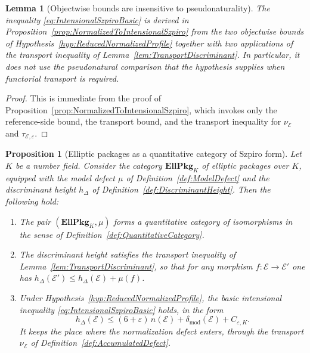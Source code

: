 \documentclass[10pt, reqno]{amsart}
\theoremstyle{plain}
\newtheorem{proposition}[theorem]{Proposition}
\newtheorem{lemma}[theorem]{Lemma}
\theoremstyle{definition}
\theoremstyle{plain}
\newcommand{\defect}{\delta_{\mathrm{mod}}}
\begin{document}
\begin{lemma}[Objectwise bounds are insensitive to pseudonaturality]\label{lem:ObjectwiseInsensitive}
The inequality \eqref{eq:IntensionalSzpiroBasic} is derived in Proposition~\ref{prop:NormalizedToIntensionalSzpiro} from the two objectwise bounds of Hypothesis~\ref{hyp:ReducedNormalizedProfile} together with two applications of the transport inequality of Lemma~\ref{lem:TransportDiscriminant}. In particular, it does not use the pseudonatural comparison that the hypothesis supplies when functorial transport is required.
\end{lemma}

\begin{proof}
This is immediate from the proof of Proposition~\ref{prop:NormalizedToIntensionalSzpiro}, which invokes only the reference-side bound, the transport bound, and the transport inequality for $\nu_{\mathcal{E}}$ and $\tau_{\mathcal{E},\varepsilon}$.
\end{proof}

\begin{proposition}[Elliptic packages as a quantitative category of Szpiro form]\label{prop:EllPkgQuantitativeSzpiro}
Let $K$ be a number field. Consider the category $\mathbf{EllPkg}_K$ of elliptic packages over $K$, equipped with the model defect $\mu$ of Definition~\ref{def:ModelDefect} and the discriminant height $h_\Delta$ of Definition~\ref{def:DiscriminantHeight}. Then the following hold:
\begin{enumerate}
\item[(i)] The pair $(\mathbf{EllPkg}_K,\mu)$ forms a quantitative category of isomorphisms in the sense of Definition~\ref{def:QuantitativeCategory}.
\item[(ii)] The discriminant height satisfies the transport inequality of Lemma~\ref{lem:TransportDiscriminant}, so that for any morphism $f \colon \mathcal{E} \to \mathcal{E}'$ one has $h_\Delta(\mathcal{E}') \le h_\Delta(\mathcal{E}) + \mu(f)$.
\item[(iii)] Under Hypothesis~\ref{hyp:ReducedNormalizedProfile}, the basic intensional inequality \eqref{eq:IntensionalSzpiroBasic} holds, in the form
  \[
    h_\Delta(\mathcal{E})
    \le
    (6+\varepsilon)\,n(\mathcal{E})
    +
    \defect(\mathcal{E})
    +
    C_{\varepsilon,K}.
  \]
It keeps the place where the normalization defect enters, through the transport $\nu_{\mathcal{E}}$ of Definition~\ref{def:AccumulatedDefect}.
\end{enumerate}
\end{proposition}
\end{document}
